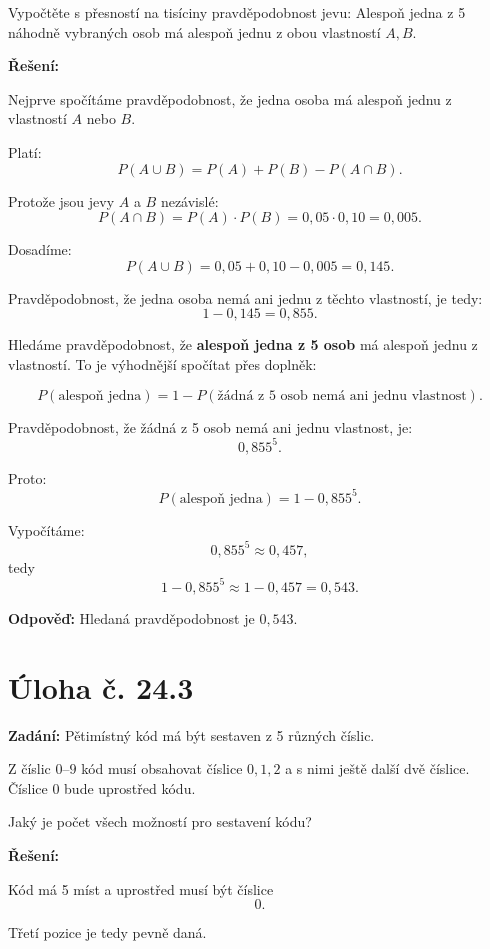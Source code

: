 \documentclass[12pt,a4paper]{article}
\begin{document}
Vypočtěte s přesností na tisíciny pravděpodobnost jevu:  
Alespoň jedna z 5 náhodně vybraných osob má alespoň jednu z obou vlastností \(A, B\).

\bigskip

\textbf{Řešení:}

Nejprve spočítáme pravděpodobnost, že jedna osoba má alespoň jednu z vlastností \(A\) nebo \(B\).

Platí:
\[
P(A\cup B)=P(A)+P(B)-P(A\cap B).
\]

Protože jsou jevy \(A\) a \(B\) nezávislé:
\[
P(A\cap B)=P(A)\cdot P(B)=0{,}05\cdot 0{,}10=0{,}005.
\]

Dosadíme:
\[
P(A\cup B)=0{,}05+0{,}10-0{,}005=0{,}145.
\]

Pravděpodobnost, že jedna osoba nemá ani jednu z těchto vlastností, je tedy:
\[
1-0{,}145=0{,}855.
\]

Hledáme pravděpodobnost, že \textbf{alespoň jedna z 5 osob} má alespoň jednu z vlastností.  
To je výhodnější spočítat přes doplněk:

\[
P(\text{alespoň jedna})=1-P(\text{žádná z 5 osob nemá ani jednu vlastnost}).
\]

Pravděpodobnost, že žádná z 5 osob nemá ani jednu vlastnost, je:
\[
0{,}855^5.
\]

Proto:
\[
P(\text{alespoň jedna})=1-0{,}855^5.
\]

Vypočítáme:
\[
0{,}855^5 \approx 0{,}457,
\]
tedy
\[
1-0{,}855^5 \approx 1-0{,}457=0{,}543.
\]

\bigskip

\textbf{Odpověď:}  
Hledaná pravděpodobnost je \(0{,}543\).




\section*{Úloha č. 24.3}

\textbf{Zadání:}  
Pětimístný kód má být sestaven z 5 různých číslic.

Z číslic \(0\)–\(9\) kód musí obsahovat číslice \(0,1,2\) a s nimi ještě další dvě číslice. Číslice \(0\) bude uprostřed kódu.

Jaký je počet všech možností pro sestavení kódu?

\bigskip

\textbf{Řešení:}

Kód má 5 míst a uprostřed musí být číslice
\[
0.
\]

Třetí pozice je tedy pevně daná.
\end{document}
